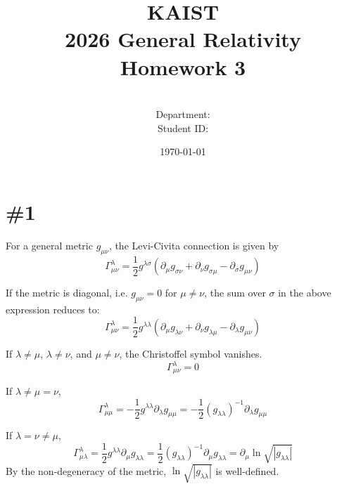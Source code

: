 \documentclass[a4paper,11pt]{article}
\title{KAIST\\2026 General Relativity\\
Homework 3\bigskip}
\author{\textbf{\Large \name} \\
Department: \department\\
Student ID: \studentid}
\date{\today}
\begin{document}
\thispagestyle{empty}
\maketitle
\tableofcontents
{}
\setcounter{secnumdepth}{1}
\setcounter{tocdepth}{2}

\newcommand{\tr}{\operatorname{tr}}
\newcommand{\sgn}{\operatorname{sgn}}
\newcommand{\supp}{\operatorname{supp}}
\newcommand{\id}{\operatorname{id}}
\renewcommand{\Re}{\operatorname{Re}}
\renewcommand{\Im}{\operatorname{Im}}
\newcommand{\boltz}{k_{\mathrm{B}}}

\section{\#1}

For a general metric $g_{\mu\nu}$, the Levi-Civita connection is given by
\begin{equation}
    \Gamma^{\lambda}_{\mu\nu} = \frac{1}{2} g^{\lambda\sigma} (\partial_\mu g_{\sigma\nu} + \partial_\nu g_{\sigma\mu} - \partial_\sigma g_{\mu\nu})
\end{equation}

If the metric is diagonal, i.e. $g_{\mu\nu} = 0$ for $\mu \neq \nu$, the sum over $\sigma$ in the above expression reduces to:
\begin{equation}
    \Gamma^{\lambda}_{\mu\nu} = \frac{1}{2} g^{\lambda\lambda} (\partial_\mu g_{\lambda\nu} + \partial_\nu g_{\lambda\mu} - \partial_\lambda g_{\mu\nu})
\end{equation}

If $\lambda\ne\mu$, $\lambda\ne\nu$, and $\mu\ne\nu$, the Christoffel symbol vanishes. 
\begin{equation}
    \Gamma^{\lambda}_{\mu\nu} = 0
\end{equation}

If $\lambda \ne \mu=\nu$,
\begin{equation}
    \Gamma^{\lambda}_{\mu\mu} = -\frac{1}{2} g^{\lambda\lambda} \partial_\lambda g_{\mu\mu} = -\frac{1}{2} (g_{\lambda\lambda})^{-1} \partial_\lambda g_{\mu\mu}
\end{equation}

If $\lambda = \nu \ne \mu$,
\begin{equation}
    \Gamma^{\lambda}_{\mu\lambda} = \frac{1}{2} g^{\lambda\lambda} \partial_\mu g_{\lambda\lambda} = \frac{1}{2} (g_{\lambda\lambda})^{-1} \partial_\mu g_{\lambda\lambda} = \partial_\mu \ln \sqrt{|g_{\lambda\lambda}|}
\end{equation}
By the non-degeneracy of the metric, $\ln \sqrt{|g_{\lambda\lambda}|}$ is well-defined.
\end{document}
